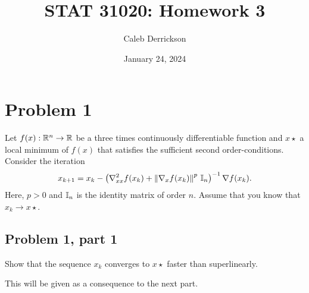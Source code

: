 

\title{STAT 31020: Homework 3}
\author{Caleb Derrickson}
\date{January 24, 2024}


\onehalfspacing
\maketitle
\allowdisplaybreaks
\tableofcontents

\newpage
\section{Problem 1}
Let $f(x): \mathbb{R}^n \rightarrow \mathbb{R}$ be a three times continuously differentiable function and $x\star$ a local minimum of $f(x)$ that satisfies the sufficient second order-conditions. Consider the iteration
\begin{align}
    x_{k+1} = x_k - \left(\grad^2_{xx}f(x_k) + \norm{\grad_x f(x_k)}^p \ \id_n \right)\inv \grad f(x_k).\label{p1: first}
\end{align}
Here, $p > 0$ and $\mathbb{I}_n$ is the identity matrix of order $n$. Assume that you know that $x_k \rightarrow x\star$.
\subsection{Problem 1, part 1}
Show that the sequence $x_k$ converges to $x\star$ faster than superlinearly.
\partbreak
\begin{solution}

    This will be given as a consequence to the next part. 
\end{solution}
